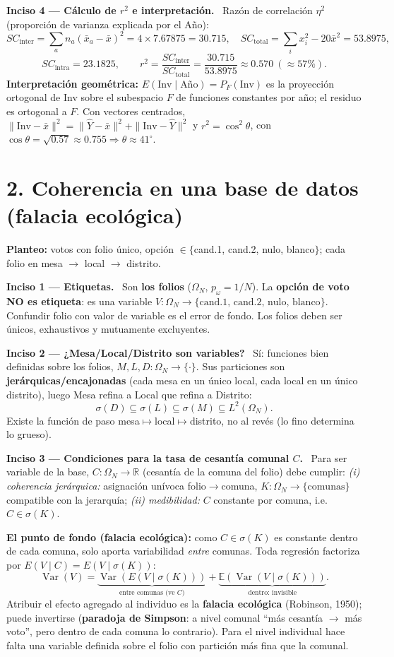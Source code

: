 \documentclass[11pt]{article}
\newcommand{\E}{\mathbb{E}}
\newcommand{\R}{\mathbb{R}}
\newcommand{\Var}{\operatorname{Var}}
\newcommand{\sg}{\sigma}
\newcommand{\inc}[1]{\smallskip\noindent\textbf{\color{blue!30!black}#1}\ }
\begin{document}
\inc{Inciso 4 — Cálculo de $r^2$ e interpretación.} Razón de correlación $\eta^2$ (proporción de varianza explicada por el Año):
\[ SC_\text{inter}=\sum_a n_a(\bar x_a-\bar x)^2=4\times7.67875=30.715,\quad
SC_\text{total}=\sum_i x_i^2-20\bar x^2=53.8975, \]
\[ SC_\text{intra}=23.1825,\qquad
r^2=\frac{SC_\text{inter}}{SC_\text{total}}=\frac{30.715}{53.8975}\approx0.570\ (\approx57\%). \]
\textbf{Interpretación geométrica:} $E(\text{Inv}\mid\text{Año})=P_F(\text{Inv})$ es la proyección
ortogonal de Inv sobre el subespacio $F$ de funciones constantes por año; el residuo es ortogonal a $F$.
Con vectores centrados, $\|\text{Inv}-\bar x\|^2=\|\hat Y-\bar x\|^2+\|\text{Inv}-\hat Y\|^2$ y
$r^2=\cos^2\theta$, con $\cos\theta=\sqrt{0.57}\approx0.755\Rightarrow\theta\approx41^\circ$.

\section*{2. Coherencia en una base de datos (falacia ecológica)}
\textbf{Planteo:} votos con folio único, opción $\in\{$cand.1, cand.2, nulo, blanco$\}$; cada folio en mesa $\to$ local $\to$ distrito.

\inc{Inciso 1 — Etiquetas.} Son \textbf{los folios} ($\Omega_N$, $p_\omega=1/N$). La \textbf{opción de voto
NO es etiqueta}: es una variable $V:\Omega_N\to\{\text{cand.1, cand.2, nulo, blanco}\}$. Confundir folio con
valor de variable es el error de fondo. Los folios deben ser únicos, exhaustivos y mutuamente excluyentes.

\inc{Inciso 2 — ¿Mesa/Local/Distrito son variables?} Sí: funciones bien definidas sobre los folios,
$M,L,D:\Omega_N\to\{\cdot\}$. Sus particiones son \textbf{jerárquicas/encajonadas} (cada mesa en un único
local, cada local en un único distrito), luego Mesa refina a Local que refina a Distrito:
\[ \sg(D)\subseteq\sg(L)\subseteq\sg(M)\subseteq L^2(\Omega_N). \]
Existe la función de paso mesa$\mapsto$local$\mapsto$distrito, no al revés (lo fino determina lo grueso).

\inc{Inciso 3 — Condiciones para la tasa de cesantía comunal $C$.} Para ser variable de la base,
$C:\Omega_N\to\R$ (cesantía de la comuna del folio) debe cumplir: \emph{(i) coherencia jerárquica:}
asignación unívoca folio$\to$comuna, $K:\Omega_N\to\{\text{comunas}\}$ compatible con la jerarquía;
\emph{(ii) medibilidad:} $C$ constante por comuna, i.e. $C\in\sg(K)$.

\textbf{El punto de fondo (falacia ecológica):} como $C\in\sg(K)$ es constante dentro de cada comuna,
solo aporta variabilidad \emph{entre} comunas. Toda regresión factoriza por $E(V\mid C)=E(V\mid\sg(K))$:
\[ \Var(V)=\underbrace{\Var(E(V\mid\sg(K)))}_{\text{entre comunas (ve }C)}
+\underbrace{\E(\Var(V\mid\sg(K)))}_{\text{dentro: invisible}}. \]
Atribuir el efecto agregado al individuo es la \textbf{falacia ecológica} (Robinson, 1950); puede
invertirse (\textbf{paradoja de Simpson}: a nivel comunal ``más cesantía $\to$ más voto'', pero dentro
de cada comuna lo contrario). Para el nivel individual hace falta una variable definida sobre el folio
con partición más fina que la comunal.
\end{document}
